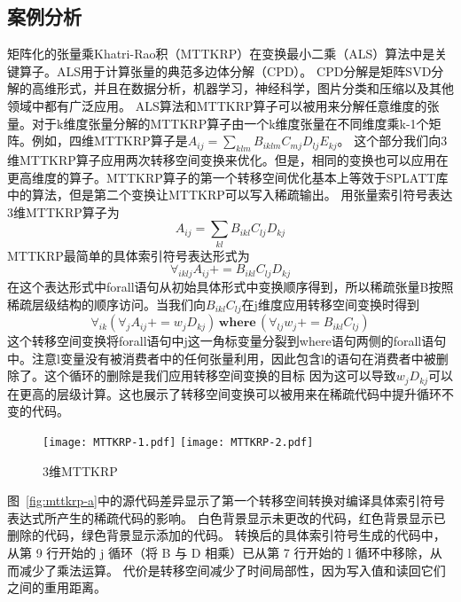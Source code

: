 \begin{translation}
\subsection{案例分析}
矩阵化的张量乘Khatri-Rao积（MTTKRP）在变换最小二乘（ALS）算法中是关键算子。ALS用于计算张量的典范多边体分解（CPD）。
CPD分解是矩阵SVD分解的高维形式，并且在数据分析，机器学习，神经科学，图片分类和压缩以及其他领域中都有广泛应用。
ALS算法和MTTKRP算子可以被用来分解任意维度的张量。对于k维度张量分解的MTTKRP算子由一个k维度张量在不同维度乘k-1个矩阵。例如，四维MTTKRP算子是$A_{ij} = \sum_{klm}B_{iklm}C_{mj}D_{lj}E_{kj}$。
这个部分我们向3维MTTKRP算子应用两次转移空间变换来优化。但是，相同的变换也可以应用在更高维度的算子。MTTKRP算子的第一个转移空间优化基本上等效于SPLATT库中的算法，但是第二个变换让MTTKRP可以写入稀疏输出。
用张量索引符号表达3维MTTKRP算子为
\begin{equation*}
  A_{ij} = \sum_{kl} B_{ikl}C_{lj}D_{kj}
\end{equation*}
MTTKRP最简单的具体索引符号表达形式为
\begin{equation*}
  \forall_{iklj} A_{ij} += B_{ikl}C_{lj}D_{kj}
\end{equation*}
在这个表达形式中forall语句从初始具体形式中变换顺序得到，所以稀疏张量B按照稀疏层级结构的顺序访问。当我们向$B_{ikl}C_{lj}$在j维度应用转移空间变换时得到
\begin{equation*}
  \forall_{ik} (\forall_j A_{ij}+=w_j D_{kj})\, \mathbf{where}\, (\forall_{lj} w_j +=B_{ikl}C_{lj})
\end{equation*}
这个转移空间变换将forall语句中j这一角标变量分裂到where语句两侧的forall语句中。注意l变量没有被消费者中的任何张量利用，因此包含l的语句在消费者中被删除了。这个循环的删除是我们应用转移空间变换的目标
因为这可以导致$w_jD_{kj}$可以在更高的层级计算。这也展示了转移空间变换可以被用来在稀疏代码中提升循环不变的代码。
\begin{figure}
  \centering
    {\texttt{[image: MTTKRP-1.pdf]}}
    {\texttt{[image: MTTKRP-2.pdf]}}
  \caption{3维MTTKRP}
  \label{fig:mttkrp-code}
\end{figure}
图~\ref{fig:mttkrp-a}中的源代码差异显示了第一个转移空间转换对编译具体索引符号表达式所产生的稀疏代码的影响。 白色背景显示未更改的代码，红色背景显示已删除的代码，绿色背景显示添加的代码。 转换后的具体索引符号生成的代码中，
从第 9 行开始的 j 循环（将 B 与 D 相乘）已从第 7 行开始的 l 循环中移除，从而减少了乘法运算。 代价是转移空间减少了时间局部性，因为写入值和读回它们之间的重用距离。 

\end{translation}
